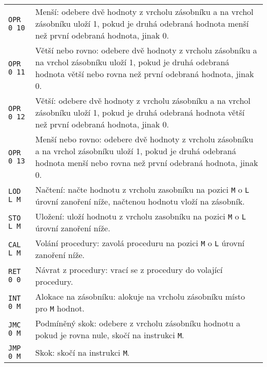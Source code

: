 \documentclass{article}
\begin{document}
\begin{longtable}{|l| p{10cm}|}
		\rule{0pt}{4ex} \texttt{OPR 0 10} & Menší: odebere dvě hodnoty z vrcholu zásobníku a na vrchol zásobníku uloží 1, pokud je druhá odebraná hodnota menší než první odebraná hodnota, jinak 0. \\
		
		\rule{0pt}{4ex} \texttt{OPR 0 11} & Větší nebo rovno: odebere dvě hodnoty z vrcholu zásobníku a na vrchol zásobníku uloží 1, pokud je druhá odebraná hodnota větší nebo rovna než první odebraná hodnota, jinak 0. \\
		
		\rule{0pt}{4ex} \texttt{OPR 0 12} & Větší: odebere dvě hodnoty z vrcholu zásobníku a na vrchol zásobníku uloží 1, pokud je druhá odebraná hodnota větší než první odebraná hodnota, jinak 0. \\
		
		\rule{0pt}{4ex} \texttt{OPR 0 13} & Menší nebo rovno: odebere dvě hodnoty z vrcholu zásobníku a na vrchol zásobníku uloží 1, pokud je druhá odebraná hodnota menší nebo rovna než první odebraná hodnota, jinak 0. \\ \hline
		
		\rule{0pt}{3ex} \texttt{LOD L M} & Načtení: načte hodnotu z vrcholu zasobníku na pozici \texttt{M} o \texttt{L} úrovní zanoření níže, načtenou hodnotu vloží na zásobník. \\
		\hline
		
		\rule{0pt}{3ex} \texttt{STO L M} & Uložení: uloží hodnotu z vrcholu zasobníku na pozici \texttt{M} o \texttt{L} úrovní zanoření níže. \\ \hline
		
		\rule{0pt}{3ex} \texttt{CAL L M} & Volání procedury: zavolá proceduru na pozici \texttt{M} o \texttt{L} úrovní zanoření níže. \\ \hline
		
		\rule{0pt}{3ex} \texttt{RET 0 0} & Návrat z procedury: vrací se z procedury do volající procedury. \\ \hline
		
		\rule{0pt}{3ex} \texttt{INT 0 M} & Alokace na zásobníku: alokuje na vrcholu zásobníku místo pro \texttt{M} hodnot. \\ \hline
		
		\rule{0pt}{3ex} \texttt{JMC 0 M} & Podmíněný skok: odebere z vrcholu zásobníku hodnotu a pokud je rovna nule, skočí na instrukci \texttt{M}. \\ \hline
		
		\rule{0pt}{3ex} \texttt{JMP 0 M} & Skok: skočí na instrukci \texttt{M}. \\ \hline
		

\end{longtable}
\end{document}

